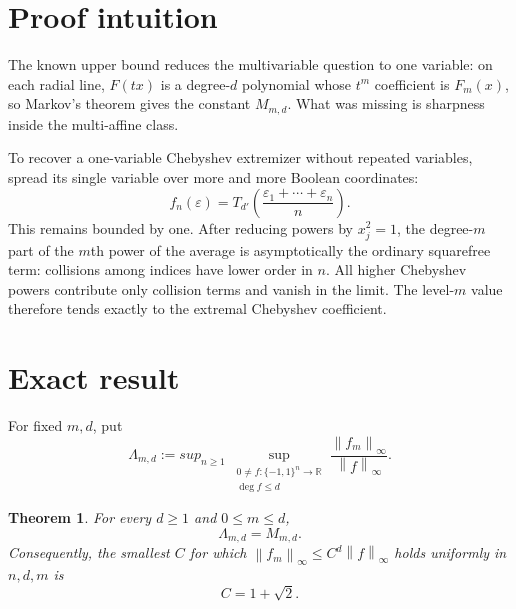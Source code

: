 \documentclass[11pt]{article}
\newtheorem{theorem}{Theorem}
\newcommand{\cube}{\{-1,1\}}
\newcommand{\norm}[1]{\left\lVert#1\right\rVert}
\newcommand{\R}{\mathbb R}
\begin{document}
\section{Proof intuition}

The known upper bound reduces the multivariable question to one variable:
on each radial line, $F(tx)$ is a degree-$d$ polynomial whose $t^m$
coefficient is $F_m(x)$, so Markov's theorem gives the constant $M_{m,d}$.
What was missing is sharpness inside the multi-affine class.

To recover a one-variable Chebyshev extremizer without repeated variables,
spread its single variable over more and more Boolean coordinates:
\[
 f_n(\varepsilon)=T_{d'}\!\left(\frac{\varepsilon_1+\cdots+\varepsilon_n}{n}\right).
\]
This remains bounded by one.  After reducing powers by $x_j^2=1$, the
degree-$m$ part of the $m$th power of the average is asymptotically the
ordinary squarefree term: collisions among indices have lower order in $n$.
All higher Chebyshev powers contribute only collision terms and vanish in the
limit.  The level-$m$ value therefore tends exactly to the extremal Chebyshev
coefficient.

\section{Exact result}

For fixed $m,d$, put
\[
 \Lambda_{m,d}:=sup_{n\ge1}\ \sup_{\substack{0\ne f:\cube^n\to\R\\
        \deg f\le d}}
 \frac{\norm{f_m}_\infty}{\norm f_\infty}.
\]

\begin{theorem}\label{thm:exact}
For every $d\ge1$ and $0\le m\le d$,
\[
 \boxed{\Lambda_{m,d}=M_{m,d}.}
\]
Consequently, the smallest $C$ for which
$\norm{f_m}_\infty\le C^d\norm f_\infty$ holds uniformly in $n,d,m$ is
\[
 \boxed{C=1+\sqrt2.}
\]
\end{theorem}
\end{document}
